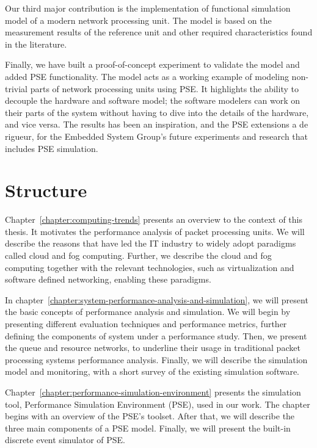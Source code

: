 Our third major contribution is the implementation of functional simulation model of a modern network processing unit. The model is based on the measurement results of the reference unit and other required characteristics found in the literature.

Finally, we have built a proof-of-concept experiment to validate the model and added PSE functionality. The model acts as a working example of modeling non-trivial parts of network processing units using PSE. It highlights the ability to decouple the hardware and software model; the software modelers can work on their parts of the system without having to dive into the details of the hardware, and vice versa. The results has been an inspiration, and the PSE extensions a de rigueur, for the Embedded System Group's future experiments and research that includes PSE simulation.


\section{Structure}
Chapter~\ref{chapter:computing-trends} presents an overview to the context of this thesis. It motivates the performance analysis of packet processing units. We will describe the reasons that have led the IT industry to widely adopt paradigms called cloud and fog computing. Further, we describe the cloud and fog computing together with the relevant technologies, such as virtualization and software defined networking, enabling these paradigms.


In chapter~\ref{chapter:system-performance-analysis-and-simulation}, we will present the basic concepts of performance analysis and simulation. We will begin by presenting different evaluation techniques and performance metrics, further defining the components of system under a performance study. Then, we present the queue and resource networks, to underline their usage in traditional packet processing systems performance analysis. Finally, we will describe the simulation model and monitoring, with a short survey of the existing simulation software.

Chapter~\ref{chapter:performance-simulation-environment} presents the simulation tool, Performance Simulation Environment (PSE), used in our work. The chapter begins with an overview of the PSE's toolset. After that, we will describe the three main components of a PSE model. Finally, we will present the built-in discrete event simulator of PSE.

